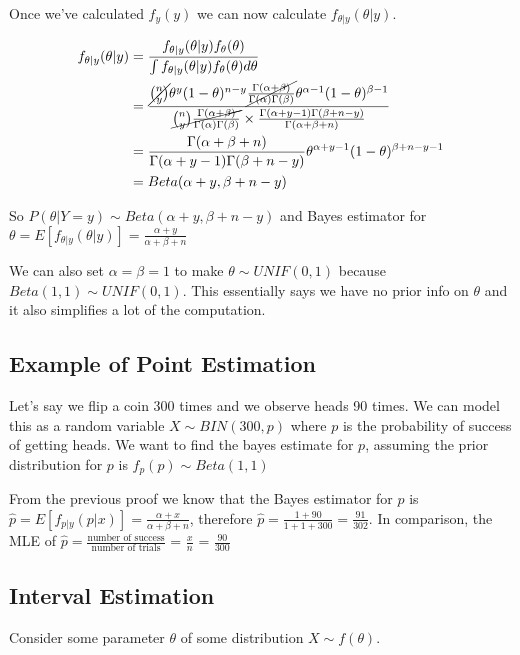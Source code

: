 \documentclass{article}
\begin{document}
Once we've calculated $f_{y}(y)$ we can now calculate $f_{\theta|y}(\theta|y)$.

\begin{align*}
f_{\theta|y}(\theta|y) 
&= \frac{f_{\theta|y}(\theta|y)f_{\theta}(\theta)}{\int f_{\theta|y}(\theta|y)f_{\theta}(\theta) d\theta}\\
&= \frac{\cancel{\binom{n}{y}}\theta^{y}(1-\theta)^{n-y} \cancel{\frac{\Gamma(\alpha+\beta)}{\Gamma(\alpha)\Gamma(\beta)}} \theta^{\alpha-1}(1-\theta)^{\beta-1} }  
{ \cancel{\binom{n}{y}\frac{\Gamma(\alpha+\beta)}{\Gamma(\alpha)\Gamma(\beta)}} \times \frac{\Gamma(\alpha + y-1)\Gamma(\beta+n-y)}{\Gamma(\alpha+\beta+n)}}\\
&=\frac{\Gamma(\alpha+\beta+n)}{\Gamma(\alpha + y-1)\Gamma(\beta+n-y)} \theta^{\alpha+y-1} (1-\theta)^{\beta+n-y-1}\\
&=Beta(\alpha+y,\beta+n-y)
\end{align*}

So $P(\theta|Y=y) \sim Beta(\alpha+y,\beta+n-y)$ and Bayes estimator for $\theta = E[f_{\theta|y}(\theta|y)] = \frac{\alpha+y}{\alpha+\beta+n}$\newline

We can also set $\alpha=\beta=1$ to make $\theta \sim UNIF(0,1)$ because $Beta(1,1) \sim UNIF(0,1)$. This essentially says we have no prior info on $\theta$ and it also simplifies a lot of the computation.

\newpage
\subsection{Example of Point Estimation}

Let's say we flip a coin 300 times and we observe heads 90 times. We can model this as a random variable $X \sim BIN(300,p)$ where $p$ is the probability of success of getting heads. We want to find the bayes estimate for $p$, assuming the prior distribution for $p$ is $f_{p}(p) \sim Beta(1,1)$\newline

From the previous proof we know that the Bayes estimator for $p$ is $\hat{p} = E[f_{p|y}(p|x)] = \frac{\alpha+x}{\alpha+\beta+n}$, therefore $\hat{p} = \frac{1+90}{1+1+300} = \frac{91}{302}$. In comparison, the MLE of $\hat{p} = \frac{\text{number of success}}{\text{number of trials}}$ = $\frac{x}{n}$ = $\frac{90}{300}$ 


\subsection{Interval Estimation}
Consider some parameter $\theta$ of some distribution $X \sim f(\theta)$.\newline
\end{document}
